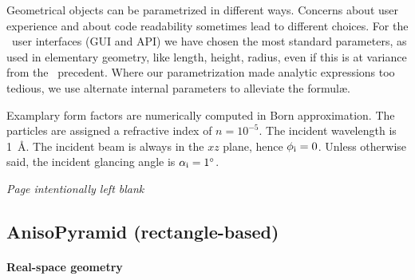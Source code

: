 Geometrical objects can be parametrized in different ways.
Concerns about user experience and about code readability
sometimes lead to different choices.
For the \BornAgain\ user interfaces (GUI and API)
we have chosen the most standard parameters,
as used in elementary geometry, like length, height, radius,
even if this is at variance from the \IsGISAXS\ precedent.
Where our parametrization made analytic expressions too tedious,
we use alternate internal parameters to alleviate the formul\ae.

Examplary form factors are numerically computed in Born approximation.
The particles are assigned a refractive index of $n=10^{-5}$.
The incident wavelength is 1~\AA.
The incident beam is always in the $xz$ plane, hence $\phi_{\text{i}}=0$.
Unless otherwise said, the incident glancing angle is $\alpha_{\text{i}}=1^\circ$.


\ifodd\value{page}\else\FloatBarrier\newpage\textit{Page intentionally left blank}\fi

\FloatBarrier\newpage
\subsection{AnisoPyramid (rectangle-based)} \label{sec:AnisoPyramid} 

\paragraph{Real-space geometry}\strut\\

